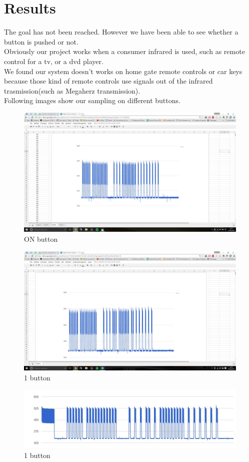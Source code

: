 \section{Results}

The goal has not been reached. However we have been able to see whether a button is pushed or not.\\
Obviously our project works when a consumer infrared is used, such as remote control for a tv, or a dvd player.\\
We found our system doesn't works on home gate remote controls or car keys because those kind of remote controls use signals out of the infrared trasmission(such as Megaherz transmission).\\
Following images show our sampling on different buttons.

\begin{figure}[h]
	\centering
	\includegraphics[scale=0.3]{graphs/onButton_2.jpg}%
	\caption{ON button}

\end{figure}

\begin{figure}[h]
	\centering
	\includegraphics[scale=0.3]{graphs/1Button.jpg}%
	\caption{1 button}
		
\end{figure}

\begin{figure}[h]
	\centering
	\includegraphics[scale=0.3]{graphs/2Button.jpg}%
	\caption{1 button}
	
\end{figure}
